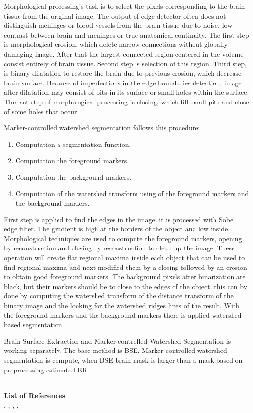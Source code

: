 Morphological processing’s task is to select the pixels corresponding to the brain tissue from the original image. The output of edge detector often does not distinguish meninges or blood vessels from the brain tissue due to noise, low contrast between brain and meninges or true anatomical continuity. The first step is morphological erosion, which delete narrow connections without globally damaging image. After that the largest connected region centered in the volume consist entirely of brain tissue. Second step is selection of this region. Third step, is binary dilatation to restore the brain due to previous erosion, which decrease brain surface. Because of imperfections in the edge boundaries detection, image after dilatation may consist of pits in its surface or small holes within the surface. The last step of morphological processing is closing, which fill small pits and close of some holes that occur.

Marker-controlled watershed segmentation follows this procedure:
\begin{enumerate}
    \item {Computation a segmentation function.}
    \item {Computation the foreground markers.}
    \item {Computation the background markers.}
    \item {Computation of the watershed transform using of the foreground markers and the background markers.}
\end{enumerate}
First step is applied to find the edges in the image, it is processed with Sobel edge filter. The gradient is high at the borders of the object and low inside. Morphological techniques are used to compute the foreground markers, opening by reconstruction and closing by reconstruction to clean up the image. These operation will create flat regional maxima inside each object that can be used to find regional maxima and next modified them by a closing followed by an erosion to obtain good foreground markers. The background pixels after binarization are black, but their markers should be to close to the edges of the object. this can by done by computing the watershed transform of the distance transform of the binary image and the looking for the watershed ridges lines of the result. With the foreground markers and the background markers there is applied watershed based segmentation.

Brain Surface Extraction and Marker-controlled Watershed Segmentation is working separately. The base method is BSE. Marker-controlled watershed segmentation is compute, when BSE brain mask is larger than a mask based on preprocessing estimated BR.

\hfill{}\\
\textbf{List of References}\\
\cite{8_dti_1}, \cite{8_dti_2}, \cite{8_dti_3}, \cite{8_dti_4},
